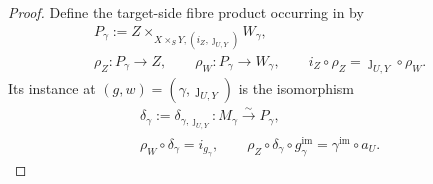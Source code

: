\begin{proof}
  Define the target-side fibre product occurring in
   by
  \[
  \begin{gathered}
    P_\gamma:=Z\times_{X\times_SY,(i_Z,\jmath_{U,Y})}W_\gamma,\\
    \rho_Z\colon P_\gamma\to Z,\qquad
    \rho_W\colon P_\gamma\to W_\gamma,\qquad
    i_Z\circ\rho_Z=\jmath_{U,Y}\circ\rho_W.                  
  \end{gathered} \tag{PS10}
  \]
  Its instance at $(g,w)=(\gamma,\jmath_{U,Y})$ is the isomorphism
  \[
  \begin{gathered}
    \delta_\gamma:=\delta_{\gamma,\jmath_{U,Y}}
      \colon M_\gamma\xrightarrow{\sim}P_\gamma,\\
    \rho_W\circ\delta_\gamma=i_{g_\gamma},\qquad
    \rho_Z\circ\delta_\gamma\circ g_\gamma^{\mathrm{im}}
      =\gamma^{\mathrm{im}}\circ a_U.                           
  \end{gathered} \tag{PS11}
  \]


\end{proof}
